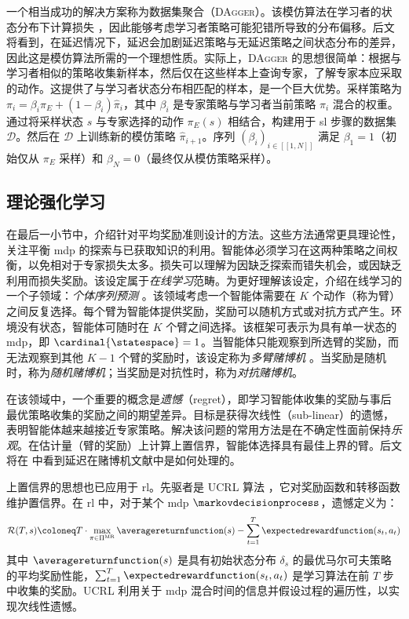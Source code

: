 一个相当成功的解决方案称为数据集聚合（\textsc{DAgger}）\cite{ross2011reduction}。该模仿算法在学习者的状态分布下计算损失 \cite{osa2018algorithmic}，因此能够考虑学习者策略可能犯错所导致的分布偏移。后文将看到，在延迟情况下，延迟会加剧延迟策略与无延迟策略之间状态分布的差异，因此这是模仿算法所需的一个理想性质。实际上，\textsc{DAgger} 的思想很简单：根据与学习者相似的策略收集新样本，然后仅在这些样本上查询专家，了解专家本应采取的动作。这提供了与学习者状态分布相匹配的样本，是一个巨大优势。采样策略为 $\pi_i = \beta_i \pi_E + (1-\beta_i) \hat{\pi}_i$，其中 $\beta_i$ 是专家策略与学习者当前策略 $\hat{\pi}_i$ 混合的权重。通过将采样状态 $s$ 与专家选择的动作 $\pi_E(s)$ 相结合，构建用于 \gls{sl} 步骤的数据集 $\mathcal{D}$。然后在 $\mathcal{D}$ 上训练新的模仿策略 $\hat{\pi}_{i+1}$。序列 $(\beta_i)_{i\in[\![1,N]\!]}$ 满足 $\beta_1=1$（初始仅从 $\pi_E$ 采样）和 $\beta_N=0$（最终仅从模仿策略采样）。

\subsection{理论强化学习}
\label{subsec:theoretical_rl}

在最后一小节中，介绍针对平均奖励准则设计的方法。这些方法通常更具理论性，关注平衡 \gls{mdp} 的探索与已获取知识的利用。智能体必须学习在这两种策略之间权衡，以免相对于专家损失太多。损失可以理解为因缺乏探索而错失机会，或因缺乏利用而损失奖励。该设定属于\emph{在线学习}范畴。为更好理解该设定，介绍在线学习的一个子领域：\emph{个体序列预测} \cite{cesa2006prediction}。该领域考虑一个智能体需要在 $K$ 个动作（称为臂）之间反复选择。每个臂为智能体提供奖励，奖励可以随机方式或对抗方式产生。环境没有状态，智能体可随时在 $K$ 个臂之间选择。该框架可表示为具有单一状态的 \gls{mdp}，即 $\cardinal{\statespace}=1$。当智能体只能观察到所选臂的奖励，而无法观察到其他 $K-1$ 个臂的奖励时，该设定称为\emph{多臂赌博机} \cite{lattimore2020bandit}。当奖励是随机时，称为\emph{随机赌博机}；当奖励是对抗性时，称为\emph{对抗赌博机}。

在该领域中，一个重要的概念是\emph{遗憾}（regret），即学习智能体收集的奖励与事后最优策略收集的奖励之间的期望差异。目标是获得次线性（sub-linear）的遗憾，表明智能体越来越接近专家策略。解决该问题的常用方法是在不确定性面前保持\emph{乐观}。在估计量（臂的奖励）上计算上置信界，智能体选择具有最佳上界的臂。后文将在  中看到延迟在赌博机文献中是如何处理的。

上置信界的思想也已应用于 \gls{rl}。先驱者是 UCRL 算法 \cite{auer2006logarithmic}，它对奖励函数和转移函数维护置信界。在 \gls{rl} 中，对于某个 \gls{mdp} $\markovdecisionprocess$，遗憾定义为：
\begin{align*}
    \mathcal{R}(T,s) \coloneq T\cdot\max_{\pi\in\Pi^{\text{MR}}} \averagereturnfunction(s) - \sum_{t=1}^T \expectedrewardfunction(s_t,a_t)
\end{align*}
其中 $\averagereturnfunction(s)$ 是具有初始状态分布 $\delta_s$ 的最优马尔可夫策略的平均奖励性能，$\textstyle \sum_{t=1}^T \expectedrewardfunction(s_t,a_t)$ 是学习算法在前 $T$ 步中收集的奖励。UCRL 利用关于 \gls{mdp} 混合时间的信息并假设过程的遍历性，以实现次线性遗憾。

